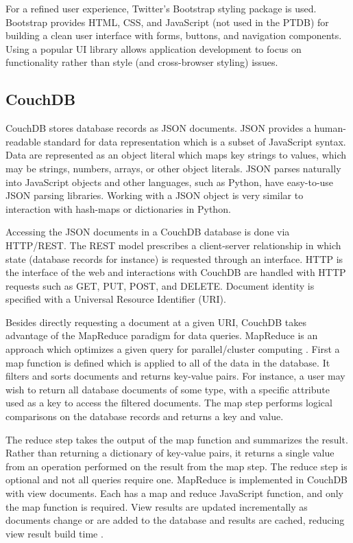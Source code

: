 \documentclass[journal]{IEEEtran}
\begin{document}
For a refined user experience, Twitter's Bootstrap styling package is used. Bootstrap 
provides HTML, CSS, and JavaScript (not used in the PTDB) for building a clean
user interface with forms, buttons, and navigation components. Using a popular UI 
library allows application development to focus on functionality rather than style (and
cross-browser styling) issues.

\subsection{CouchDB}
CouchDB stores database records as JSON documents. JSON provides a human-readable
standard for data representation which is a subset of JavaScript syntax. Data are represented as an object
literal which maps key strings to values, which may be strings, numbers, arrays, or other object literals. 
JSON parses naturally into JavaScript objects and other languages, such as Python, have easy-to-use
JSON parsing libraries. Working with a JSON object is very similar to interaction with hash-maps or 
dictionaries in Python.

Accessing the JSON documents in a CouchDB database is done via HTTP/REST. The REST model prescribes a client-server
relationship in which state (database records for instance) is requested through an interface.
HTTP is the interface of the web and interactions with CouchDB are handled with HTTP
requests such as GET, PUT, POST, and DELETE. Document identity is specified with a Universal Resource Identifier (URI).

Besides directly requesting a document at a given URI, CouchDB takes advantage of the MapReduce paradigm for data
queries. MapReduce is an approach which optimizes a given query for parallel/cluster computing \cite{mapreduce_dean}. First a map function
is defined which is applied to all of the data in the database. It filters and sorts documents and returns key-value
pairs. For instance, a user may wish to return all database documents of some type, with a specific attribute used as
a key to access the filtered documents. The map step performs logical comparisons on the database records and
returns a key and value.

The reduce step takes the output of the map function and summarizes the result. Rather than returning a dictionary
of key-value pairs, it returns a single value from an operation performed on the result from the map step. The reduce
step is optional and not all queries require one. MapReduce is implemented in CouchDB with view documents. Each has
a map and reduce JavaScript function, and only the map function is required. View results are updated incrementally as
documents change or are added to the database and results are cached, reducing view result build time \cite{couchdb_guide}.
\end{document}
